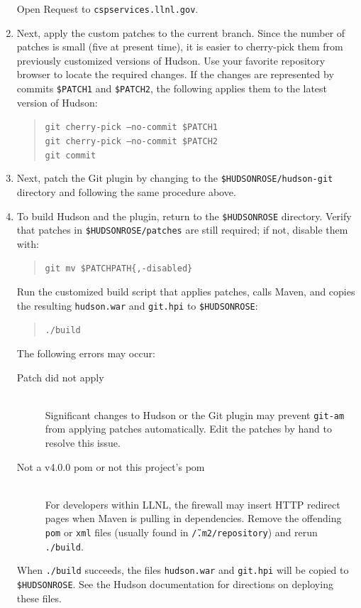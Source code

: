 \begin{enumerate}
{\begin{itemize}
{Open Request to \texttt{cspservices.llnl.gov}.}
  \end{itemize}
}
\item{
Next, apply the custom patches to the current branch. Since the number
of patches is small (five at present time), it is easier to
cherry-pick them from previously customized versions of Hudson. Use your
favorite repository browser to locate the required changes. If the
changes are represented by commits \texttt{\$PATCH1} and
\texttt{\$PATCH2}, the following applies them to the latest version of
Hudson: 
  \begin{quote}
  \texttt{git cherry-pick --no-commit \$PATCH1} \\
  \texttt{git cherry-pick --no-commit \$PATCH2} \\
  \texttt{git commit}
  \end{quote}
}

\item{
Next, patch the Git plugin by changing to the
\texttt{\$HUDSONROSE/hudson-git} directory and following the same
procedure above.
}

\item{
To build Hudson and the plugin, return to the \texttt{\$HUDSONROSE}
directory. Verify that patches
in \texttt{\$HUDSONROSE/patches} are still required; if not, disable
them with:
  \begin{quote}
  \texttt{git mv \$PATCHPATH\{,-disabled\}}
  \end{quote}
Run the customized build script that applies patches, calls Maven, and
copies the resulting \texttt{hudson.war} and \texttt{git.hpi} to
\texttt{\$HUDSONROSE}:
  \begin{quote}
  \texttt{./build}
  \end{quote}
The following errors may occur: 
  \begin{description}
  \item[Patch did not apply]{\hfill \\ Significant changes to Hudson or the Git
plugin may prevent \texttt{git-am} from applying patches automatically. Edit the
patches by hand to resolve this issue.}
  \item[Not a v4.0.0 pom or not this project's pom]{\hfill \\ For developers
within LLNL, the firewall may insert HTTP redirect pages when Maven is
pulling in dependencies. Remove the offending \texttt{pom} or
\texttt{xml} files
(usually found in \texttt{\~/.m2/repository}) and rerun
\texttt{./build}.}
  \end{description}
When \texttt{./build} succeeds, the files \texttt{hudson.war} and
\texttt{git.hpi} will be copied to \texttt{\$HUDSONROSE}. See the Hudson
documentation for directions on deploying these files.
}


\end{enumerate}
